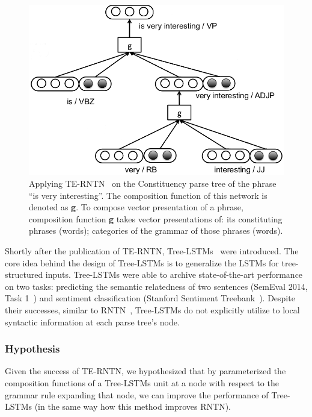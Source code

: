 \begin{figure}[H]
    \centering
    \includegraphics[scale=0.4]{figure/example-compose-tag}
    \caption[Applying TE-RNTN on the phrase ``is very interesting'']{Applying TE-RNTN~\cite{tag-embedding-rnn} on the Constituency parse tree of the phrase ``is very interesting''.
    The composition function of this network is denoted as \textbf{g}.
    To compose vector presentation of a phrase, composition function \textbf{g} takes vector presentations of: its constituting phrases (words); categories of the grammar of those phrases (words).}
    \label{fig:example-compose-tag}
\end{figure}

Shortly after the publication of TE-RNTN, Tree-LSTMs~\cite{treeLSTM} were introduced.
The core idea behind the design of Tree-LSTMs is to generalize the LSTMs for tree-structured inputs.
Tree-LSTMs were able to archive state-of-the-art performance on two tasks: predicting the semantic relatedness of two sentences (SemEval 2014, Task 1~\cite{SemeEvalTask1}) and sentiment classification (Stanford Sentiment Treebank~\cite{socher2013recursive}).
Despite their successes, similar to RNTN~\cite{socher2013recursive}, Tree-LSTMs do not explicitly utilize to local syntactic information at each parse tree's node.

\subsubsection{Hypothesis}
Given the success of TE-RNTN, we hypothesized that by parameterized the composition functions of a Tree-LSTMs unit at a node with respect to the grammar rule expanding that node, we can improve the performance of Tree-LSTMs (in the same way how this method improves RNTN).

